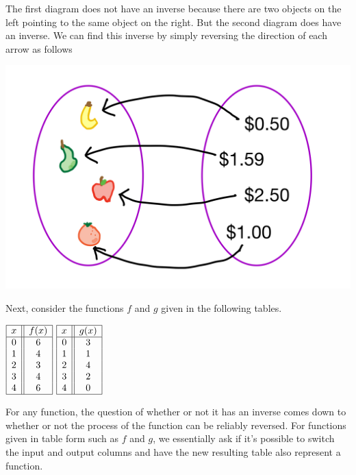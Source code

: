 \documentclass[nooutcomes]{ximera}
\begin{document}
The first diagram does not have an inverse because there are two objects on the left pointing to the same object on the right. But the second diagram does have an inverse. We can find this inverse by simply reversing the direction of each arrow as follows

\begin{image}
    \includegraphics{arrow.3.png}
\end{image}


Next, consider the functions $f$ and $g$ given in the following tables. 

\begin{center}
$
\begin{array}{ |c || c|  }
 \hline
 x & f(x)\\
 \hline
 0&6\\
 1&4\\
 2&3\\
 3&4\\
 4&6\\
 \hline
\end{array} 
$
\hspace{2cm}
$
\begin{array}{ |c || c|  }
 \hline
 x & g(x)\\
 \hline
 0&3\\
 1&1\\
 2&4\\
 3&2\\
 4&0\\
 \hline
\end{array} 
$
\end{center}

For any function, the question of whether or not it has an inverse comes down to whether or not the process of the function can be reliably reversed.  For functions given in table form such as $f$ and $g$, we essentially ask if it's possible to switch the input and output columns and have the new resulting table also represent a function.
\end{document}
